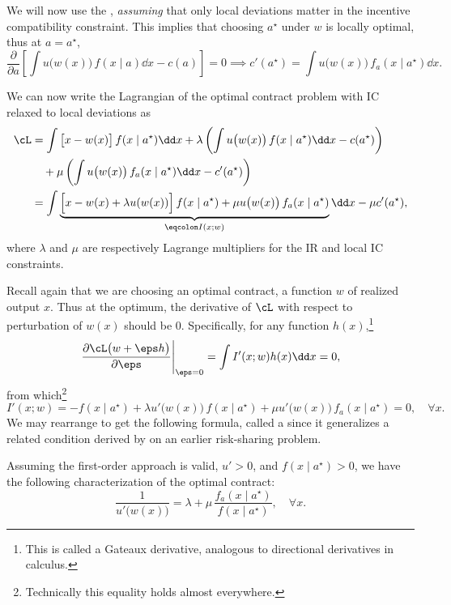 We will now use the , \emph{assuming} that only local deviations matter in the incentive compatibility constraint.
This implies that choosing \(a^\star\) under \(w\) is locally optimal, thus at \(a = a^\star\),
\[
  \frac{\partial}{\partial a} \left[ \int u\big(w(x)\big) \,f(x \mid a) \dd x - c(a) \right]
  = 0
  \implies
  c'(a^\star)
  = \int u\big(w(x)\big) \,f_a(x \mid a^\star) \dd x.
\]

We can now write the Lagrangian of the optimal contract problem with IC relaxed to local deviations as
\begin{align*}
  \cL
  &= \int \big[x - w(x)\big] \,f(x\mid a^\star) \dd x
  + \lambda \left( \int u\big(w(x)\big) \,f(x \mid a^\star) \dd x - c(a^\star) \right) \\
  &\quad+ \mu \left( \int u\big(w(x)\big) \,f_a(x \mid a^\star) \dd x - c'(a^\star) \right) \\
  &= \int \underbrace{\Big[ x - w(x) + \lambda u(w(x)) \Big]\, f(x \mid a^\star) + \mu u\big(w(x)\big) \,f_a(x \mid a^\star)}_{\eqcolon I(x; w)} \dd x - \mu c'(a^\star),
\end{align*}
where \(\lambda\) and \(\mu\) are respectively Lagrange multipliers for the IR and local IC constraints.

Recall again that we are choosing an optimal contract, a function \(w\) of realized output \(x\).
Thus at the optimum, the derivative of \(\cL\) with respect to perturbation of \(w(x)\) should be \(0\).
Specifically, for any function \(h(x)\),\footnote{This is called a Gateaux derivative, analogous to directional derivatives in calculus.}
\[
  \left. \frac{\partial \cL\big( w + \eps h \big)}{\partial \eps} \right|_{\eps = 0}
  = \int I'(x; w) h(x) \dd x
  = 0,
\]
from which\footnote{Technically this equality holds almost everywhere.}
\[
  I'(x; w)
  = -f(x \mid a^\star) + \lambda u'\big(w(x)\big) \,f(x \mid a^\star) + \mu u'\big(w(x)\big) \, f_a(x \mid a^\star)
  = 0, \quad \forall x.
\]
We may rearrange to get the following formula, called a  since it generalizes a related condition derived by \textcite{borch1962EquilibriumReinsurance} on an earlier risk-sharing problem.
\begin{proposition}
  Assuming the first-order approach is valid, \(u' > 0\), and \(f(x \mid a^\star) > 0\), we have the following characterization of the optimal contract:
  \[
    \frac{1}{u'\big(w(x)\big)}
    = \lambda + \mu\,\frac{f_a(x \mid a^\star)}{f(x \mid a^\star)}, \quad \forall x.
  \]
\end{proposition}

